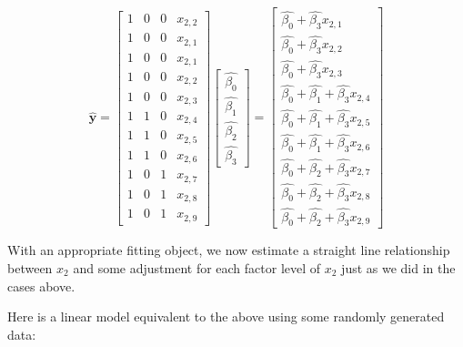 \documentclass[
  oneside]{krantz}
\begin{document}
\[
\hat{\mathbf{y}} = 
\left[\begin{array}
{cccc}
1 & 0 & 0 & x_{2,2}\\ 
1 & 0 & 0 & x_{2,1}\\
1 & 0 & 0 & x_{2,1}\\
1 & 0 & 0 & x_{2,2}\\  
1 & 0 & 0 & x_{2,3}\\ 
1 & 1 & 0 & x_{2,4}\\
1 & 1 & 0 & x_{2,5}\\  
1 & 1 & 0 & x_{2,6}\\
1 & 0 & 1 & x_{2,7}\\
1 & 0 & 1 & x_{2,8}\\  
1 & 0 & 1 & x_{2,9}
\end{array}\right]
\left[\begin{array}
{r}
\hat{\beta_0}  \\
\hat{\beta_1}  \\
\hat{\beta_2} \\
\hat{\beta_3}
\end{array}\right]=
\left[\begin{array}
{c}
\hat{\beta_0} +     \hat{\beta_3} x_{2,1}\\
\hat{\beta_0} +   \hat{\beta_3} x_{2,2}\\
\hat{\beta_0} + \hat{\beta_3} x_{2,3}\\
\hat{\beta_0} + \hat{\beta_1}  + \hat{\beta_3} x_{2,4}\\
\hat{\beta_0} + \hat{\beta_1}  + \hat{\beta_3} x_{2,5}\\
\hat{\beta_0} + \hat{\beta_1}  + \hat{\beta_3} x_{2,6}\\
\hat{\beta_0} + \hat{\beta_2}  + \hat{\beta_3} x_{2,7}\\
\hat{\beta_0} + \hat{\beta_2}  + \hat{\beta_3} x_{2,8}\\
\hat{\beta_0} + \hat{\beta_2}  + \hat{\beta_3} x_{2,9} 
\end{array}\right]
\]

With an appropriate fitting object, we now estimate a straight line relationship between \(x_2\) and some adjustment for each factor level of \(x_2\) just as we did in the cases above.

Here is a linear model equivalent to the above using some randomly generated data:
\end{document}

